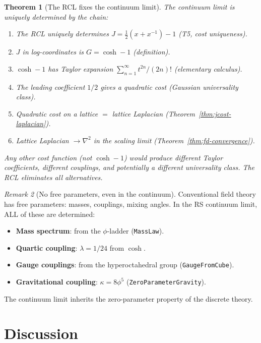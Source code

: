 \documentclass[11pt,a4paper]{article}
\theoremstyle{plain}
\newtheorem{theorem}{Theorem}[section]
\theoremstyle{definition}
\theoremstyle{remark}
\newtheorem{remark}[theorem]{Remark}
\newcommand{\Jcost}{J}
\newcommand{\Jlog}{G}
\begin{document}
\begin{theorem}[The RCL fixes the continuum limit]
\label{thm:why-this}
The continuum limit is uniquely determined by the chain:
\begin{enumerate}[nosep]
\item The RCL uniquely determines $\Jcost = \frac{1}{2}(x + x^{-1}) - 1$
  (T5, cost uniqueness).
\item $\Jcost$ in log-coordinates is $\Jlog = \cosh - 1$
  (definition).
\item $\cosh - 1$ has Taylor expansion $\sum_{n=1}^\infty t^{2n}/(2n)!$
  (elementary calculus).
\item The leading coefficient $1/2$ gives a quadratic cost
  (Gaussian universality class).
\item Quadratic cost on a lattice $=$ lattice Laplacian
  (Theorem~\ref{thm:jcost-laplacian}).
\item Lattice Laplacian $\to \nabla^2$ in the scaling limit
  (Theorem~\ref{thm:fd-convergence}).
\end{enumerate}
Any other cost function (not $\cosh - 1$) would produce different
Taylor coefficients, different couplings, and potentially a different
universality class.  The RCL eliminates all alternatives.
\end{theorem}

\begin{remark}[No free parameters, even in the continuum]
Conventional field theory has free parameters: masses, couplings,
mixing angles.  In the RS continuum limit, ALL of these are determined:
\begin{itemize}[nosep]
\item \textbf{Mass spectrum}: from the $\phi$-ladder (\texttt{MassLaw}).
\item \textbf{Quartic coupling}: $\lambda = 1/24$ from $\cosh$.
\item \textbf{Gauge couplings}: from the hyperoctahedral group
  (\texttt{GaugeFromCube}).
\item \textbf{Gravitational coupling}: $\kappa = 8\phi^5$
  (\texttt{ZeroParameterGravity}).
\end{itemize}
The continuum limit inherits the zero-parameter property of the
discrete theory.
\end{remark}

\section{Discussion}
\label{sec:discussion}
\end{document}
